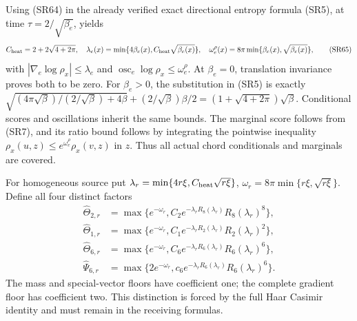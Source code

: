 \documentclass[11pt]{article}
\begin{document}
Using (SR64) in the already verified exact directional entropy formula (SR5), at time \(\tau=2/\sqrt{\beta_e}\), yields
\[
C_{\rm heat}=2+2\sqrt{4+2\pi},\quad
\lambda_e(x)=\min\{4\beta_e(x),C_{\rm heat}\sqrt{\beta_e(x)}\},\quad
\omega_e^{\rho}(x)=8\pi\min\{\beta_e(x),\sqrt{\beta_e(x)}\},
\tag{SR65}
\]
with \(|\nabla_e\log\rho_x|\le\lambda_e\) and
\(\operatorname{osc}_e\log\rho_x\le\omega_e^\rho\).
At \(\beta_e=0\), translation invariance proves both to be zero. For \(\beta_e>0\), the substitution in (SR5) is exactly
\(\sqrt{(4\pi\sqrt\beta)/(2/\sqrt\beta)+4\beta}+(2/\sqrt\beta)\beta/2=(1+\sqrt{4+2\pi})\sqrt\beta\).
Conditional scores and oscillations inherit the same bounds. The marginal score follows from (SR7), and its ratio bound follows by integrating the pointwise inequality \(\rho_x(u,z)\le e^{\omega_e^\rho}\rho_x(v,z)\) in \(z\). Thus all actual chord conditionals and marginals are covered.

For homogeneous source put \(\lambda_r=\min\{4r\xi,C_{\rm heat}\sqrt{r\xi}\}\), \(\omega_r=8\pi\min\{r\xi,\sqrt{r\xi}\}\). Define all four distinct factors
\[
\begin{aligned}
\widehat\Theta_{2,r}&=\max\{e^{-\omega_r},C_2e^{-\lambda_rR_8(\lambda_r)}R_8(\lambda_r)^8\},\\
\widehat\Theta_{1,r}&=\max\{e^{-\omega_r},C_1e^{-\lambda_rR_2(\lambda_r)}R_2(\lambda_r)^2\},\\
\widehat\Theta_{6,r}&=\max\{e^{-\omega_r},C_6e^{-\lambda_rR_6(\lambda_r)}R_6(\lambda_r)^6\},\\
\widehat\Psi_{6,r}&=\max\{2e^{-\omega_r},c_6e^{-\lambda_rR_6(\lambda_r)}R_6(\lambda_r)^6\}.
\end{aligned}\tag{SR66}
\]
The mass and special-vector floors have coefficient one; the complete gradient floor has coefficient two. This distinction is forced by the full Haar Casimir identity and must remain in the receiving formulas.
\end{document}
